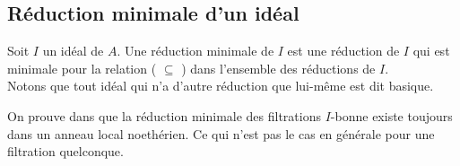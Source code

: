 \subsection{Réduction minimale d'un idéal}
\begin{madefinition}
	Soit $I$ un idéal de $A$. Une réduction minimale de $I$ est une réduction de $I$ qui est minimale pour la relation ( $\subseteq$ ) dans l'ensemble des réductions de $I$.\\
	Notons que tout idéal qui n'a d'autre réduction que lui-même est dit basique.
\end{madefinition}
\begin{maremarque}
	On prouve dans \cite{2} que la réduction minimale des filtrations $I$-bonne existe toujours dans un anneau local noethérien. Ce qui n'est pas le cas en générale pour une filtration quelconque.
\end{maremarque}
